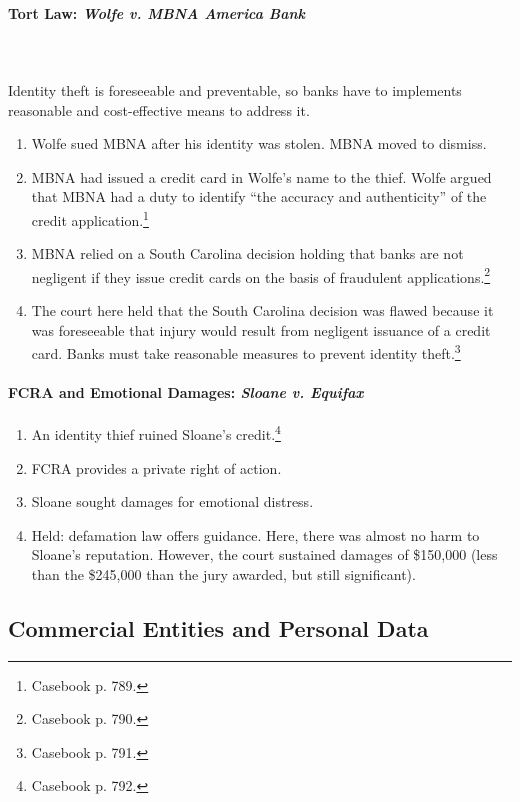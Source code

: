 \paragraph{Tort Law: \emph{Wolfe v. MBNA America Bank}}
~\\\\
Identity theft is foreseeable and preventable, so banks have to implements 
reasonable and cost-effective means to address it.

\begin{enumerate}
    \item Wolfe sued MBNA after his identity was stolen. MBNA moved to dismiss.
    \item MBNA had issued a credit card in Wolfe's name to the thief. Wolfe 
    argued that MBNA had a duty to identify ``the accuracy and authenticity'' of 
    the credit application.\footnote{Casebook p. 789.}
    \item MBNA relied on a South Carolina decision holding that banks are not 
    negligent if they issue credit cards on the basis of fraudulent 
    applications.\footnote{Casebook p. 790.}
    \item The court here held that the South Carolina decision was flawed 
    because it was foreseeable that injury would result from negligent issuance 
    of a credit card. Banks must take reasonable measures to prevent identity 
    theft.\footnote{Casebook p. 791.}
\end{enumerate}

\paragraph{FCRA and Emotional Damages: \emph{Sloane v. Equifax}}

\begin{enumerate}
    \item An identity thief ruined Sloane's credit.\footnote{Casebook p. 792.}
    \item FCRA provides a private right of action.
    \item Sloane sought damages for emotional distress.
    \item Held: defamation law offers guidance. Here, there was almost no harm 
    to Sloane's reputation. However, the court sustained damages of \$150,000 
    (less than the \$245,000 than the jury awarded, but still significant).
\end{enumerate}

\subsection{Commercial Entities and Personal Data}

